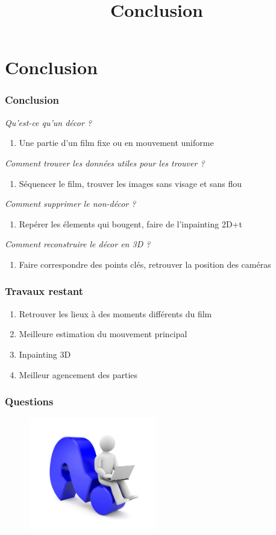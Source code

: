 \section{Conclusion}
 \begin{frame}
 \title{Conclusion}
 \titlepage

 \end{frame}
 

\begin{frame}
\frametitle{Conclusion}
\emph{Qu'est-ce qu'un décor ?}
\begin{enumerate}[-]
\item Une partie d'un film fixe ou en mouvement uniforme
\end{enumerate}
\emph{Comment trouver les données utiles pour les trouver ?}
\begin{enumerate}[-]
\item Séquencer le film, trouver les images sans visage et sans flou
\end{enumerate}
\emph{Comment supprimer le non-décor ?}
\begin{enumerate}[-]
\item Repérer les élements qui bougent, faire de l'inpainting 2D+t
\end{enumerate}
\emph{Comment reconstruire le décor en 3D ?}
\begin{enumerate}[-]
\item Faire correspondre des points clés, retrouver la position des caméras
\end{enumerate}
\end{frame}

\begin{frame}
\frametitle{Travaux restant}
\begin{enumerate}
\item Retrouver les lieux à des moments différents du film
\item Meilleure estimation du mouvement principal
\item Inpainting 3D
\item Meilleur agencement des parties
\end{enumerate}
\end{frame}



\nocite{*}
\begin{frame}[allowframebreaks]
    
    
\end{frame}


 \begin{frame}
 \frametitle{Questions}
 \begin{figure}
 \includegraphics[width=0.5\textwidth]{Fig/question.jpg}
 \end{figure}

\end{frame}

